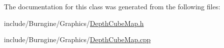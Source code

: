 The documentation for this class was generated from the following files\-:\begin{DoxyCompactItemize}
\item 
include/\-Burngine/\-Graphics/\hyperlink{_depth_cube_map_8h}{Depth\-Cube\-Map.\-h}\item 
include/\-Burngine/\-Graphics/\hyperlink{_depth_cube_map_8cpp}{Depth\-Cube\-Map.\-cpp}\end{DoxyCompactItemize}
